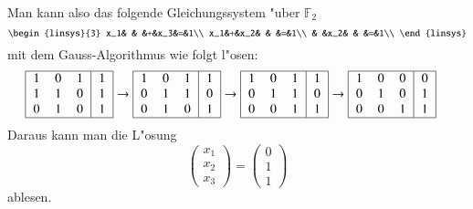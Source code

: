 Man kann also das folgende Gleichungssystem "uber $\mathbb F_2$
\begin{equation}
\begin{linsys}{3}
x_1& &   &+&x_3&=&1\\
x_1&+&x_2& &   &=&1\\
   & &x_2& &   &=&1\\
\end{linsys}
\label{ffield:gleichung}
\end{equation}
mit dem Gauss-Algorithmus wie folgt l"osen:
\begin{align*}
\begin{tabular}{|>{$}c<{$}>{$}c<{$}>{$}c<{$}|>{$}c<{$}|}
\hline
1&0&1&1\\
1&1&0&1\\
0&1&0&1\\
\hline
\end{tabular}
&
\rightarrow
\begin{tabular}{|>{$}c<{$}>{$}c<{$}>{$}c<{$}|>{$}c<{$}|}
\hline
1&0&1&1\\
0&1&1&0\\
0&1&0&1\\
\hline
\end{tabular}
\rightarrow
\begin{tabular}{|>{$}c<{$}>{$}c<{$}>{$}c<{$}|>{$}c<{$}|}
\hline
1&0&1&1\\
0&1&1&0\\
0&0&1&1\\
\hline
\end{tabular}
\rightarrow
\begin{tabular}{|>{$}c<{$}>{$}c<{$}>{$}c<{$}|>{$}c<{$}|}
\hline
1&0&0&0\\
0&1&0&1\\
0&0&1&1\\
\hline
\end{tabular}
\end{align*}
Daraus kann man die L"osung
\[
\begin{pmatrix}x_1\\x_2\\x_3\end{pmatrix}
=
\begin{pmatrix}0\\1\\1\end{pmatrix}
\]
ablesen.

